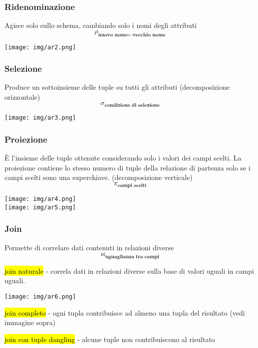 \documentclass[a4paper]{article}
\begin{document}
\subsubsection{Ridenominazione}
Agisce solo sullo schema, cambiando solo i nomi degli attributi
\[\rho_{\textbf{nuovo nome}\leftarrow \textbf{vecchio nome}}\]
\begin{center}
      \texttt{[image: img/ar2.png]}
\end{center}\par \subsubsection{Selezione}
Produce un sottoinsieme delle tuple su tutti gli attributi (decomposizione orizzontale)
\[\sigma_{\textbf{condizione di selezione}}\]
\begin{center}
      \texttt{[image: img/ar3.png]}
\end{center}\par \subsubsection{Proiezione}
È l’insieme delle tuple ottenute considerando solo i valori dei campi scelti. La proiezione contiene lo stesso numero di tuple della relazione di partenza solo se i campi scelti sono una superchiave. (decomposizione verticale)
\[\pi_{\textbf{campi scelti}}\]
\begin{center}
      \texttt{[image: img/ar4.png]}\\
      \texttt{[image: img/ar5.png]}
\end{center}\par \subsubsection{Join}
Permette di correlare dati contenuti in relazioni diverse
\[\Join_{\textbf{uguaglianza tra campi}}\]\par \hl{join naturale} - correla dati in relazioni diverse sulla base di valori uguali in campi uguali.
\begin{center}
      \texttt{[image: img/ar6.png]}
\end{center}\par \hl{join completo} - ogni tupla contribuisce ad almeno una tupla del risultato (vedi immagine sopra)\medskip\\\par \hl{join con tuple dangling} - alcune tuple non contribuiscono al risultato
\end{document}
